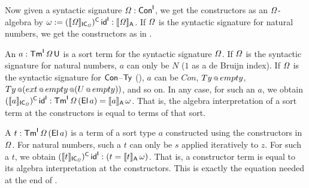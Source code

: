 \documentclass[a4paper,UKenglish,cleveref, autoref]{lipics-v2019}
\begin{document}
\begin{example}\label{ex:constructors}
  Now given a syntactic signature $\mathit{\Omega}:\mathsf{Con}^{\mathsf{I}}$, we get the
  constructors as an $\mathit{\Omega}$-algebra by
  $\omega:=(\llbracket\mathit{\Omega}\rrbracket_{\mathsf{IC}_{\mathit{\Omega}}})^{\mathsf{C}}\,\mathsf{id}^{\mathsf{I}} :
  \llbracket\mathit{\Omega}\rrbracket_{\mathsf{A}}$. If $\mathit{\Omega}$ is the syntactic signature for natural
  numbers, we get the constructors as in .

  An $a : \mathsf{Tm}^{\mathsf{I}}\,\mathit{\Omega}\,\mathsf{U}$ is a sort term for the syntactic
  signature $\mathit{\Omega}$. If $\mathit{\Omega}$ is the syntactic signature for
  natural numbers, $a$ can only be $N$ ($1$ as a de Bruijn index). If
  $\mathit{\Omega}$ is the syntactic signature for $\mathsf{Con}$--$\mathsf{Ty}$
  (), $a$ can be $Con$, $Ty\mathop{{\scriptstyle @}}{empty}$,
  $Ty\mathop{{\scriptstyle @}}({ext}\mathop{{\scriptstyle @}} {empty}\mathop{{\scriptstyle @}}(U\mathop{{\scriptstyle @}}{empty}))$, and so
  on. In any case, for such an $a$, we obtain
  $(\llbracket a\rrbracket_{\mathsf{IC}_{\mathit{\Omega}}})^{\mathsf{C}}\,\mathsf{id}^{\mathsf{I}} : \mathsf{Tm}^{\mathsf{I}}\,\mathit{\Omega}\,(\mathsf{El}\,a) = \llbracket
  a\rrbracket_{\mathsf{A}}\,\omega$. That is, the algebra interpretation of a sort term
  at the constructors is equal to terms of that sort.

  A $t : \mathsf{Tm}^{\mathsf{I}}\,\mathit{\Omega}\,(\mathsf{El}\,a)$ is a term of a sort type $a$
  constructed using the constructors in $\mathit{\Omega}$. For natural numbers,
  such a $t$ can only be $s$ applied iteratively to $z$. For such a
  $t$, we obtain
  $(\llbracket t\rrbracket_{\mathsf{IC}_{\mathit{\Omega}}})^{\mathsf{C}}\,\mathsf{id}^{\mathsf{I}} : (t = \llbracket
  t\rrbracket_{\mathsf{A}}\,\omega)$. That is, a constructor term is equal to its
  algebra interpretation at the constructors. This is exactly the
  equation needed at the end of .
\end{example}
\end{document}
